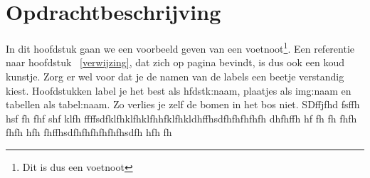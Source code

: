 \chapter{Opdrachtbeschrijving}
In dit hoofdstuk gaan we een voorbeeld geven van een voetnoot\footnote{Dit is dus een voetnoot}. Een referentie naar hoofdstuk ~\ref{verwijzing}, dat zich op pagina \pageref{verwijzing} bevindt, is dus ook een koud kunstje. Zorg er wel voor dat je de namen van de labels een beetje verstandig kiest. Hoofdstukken label je het best als hfdstk:naam, plaatjes als img:naam en tabellen als tabel:naam. Zo verlies je zelf de bomen in het bos niet.
\newpage
SDffjfhd fsffh hsf
fh fhf
shf klfh
ffffsdfklfhklfhklfhhfklfhkldhffhsdfhfhfhfhfh
\newpage
dhfhffh hf fh fh fhfh fhfh hfh fhffhsdfhfhfhfhfhfhsdfh hfh fh
 



